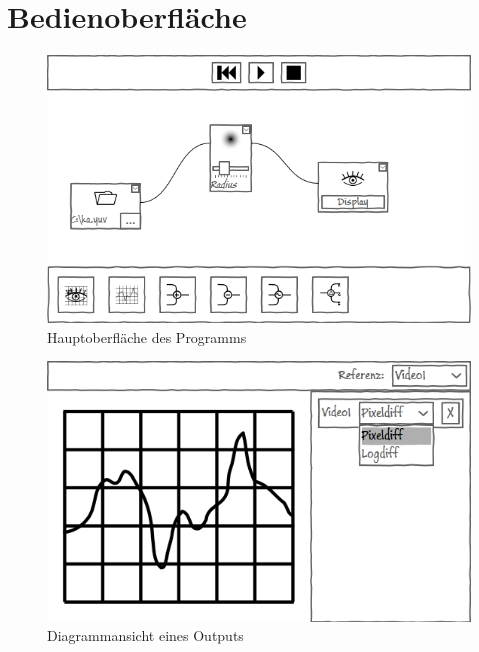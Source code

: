 \section{Bedienoberfläche}

\begin{figure}[h!]
	\centering
	\includegraphics[scale=0.8]{resources/main-screen.png}
	\caption{Hauptoberfläche des Programms}
\end{figure}
\begin{figure}[h!]
	\centering
	\includegraphics[scale=0.8]{resources/diagram-screen.png}
	\caption{Diagrammansicht eines Outputs}
\end{figure}
